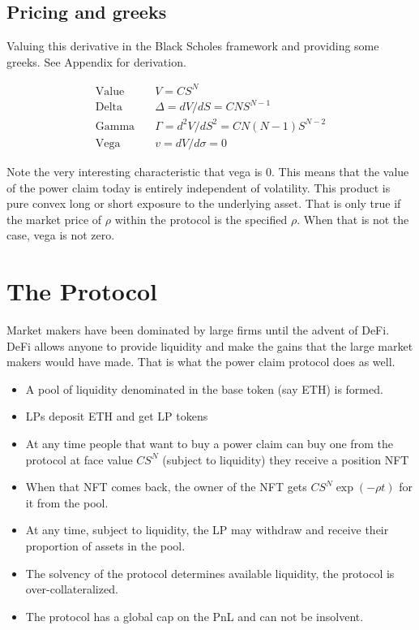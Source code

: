 \documentclass[12pt]{article}
\begin{document}
    \subsection{Pricing and greeks}

    Valuing this derivative in the Black Scholes framework and providing some greeks. See Appendix for derivation.

    \begin{align*}
        \text{Value}\quad & V = C S^N\\
        \text{Delta}\quad & \Delta = dV/dS = C N S^{N-1}\\
        \text{Gamma}\quad & \Gamma = d^2 V / d S^2 = C N(N-1) S^{N-2} \\
        \text{Vega}\quad & v = dV/d\sigma =  0
    \end{align*}

    Note the very interesting characteristic that vega is 0. This means that the value of the power claim today is entirely independent of volatility. This product is pure convex long or short exposure to the underlying asset. That is only true if the market price of $\rho$ within the protocol is the specified $\rho$. When that is not the case, vega is not zero.

    \section{The Protocol}

    Market makers have been dominated by large firms until the advent of DeFi. DeFi allows anyone to provide liquidity and make the gains that the large market makers would have made. That is what the power claim protocol does as well.

    \begin{itemize}
        \item A pool of liquidity denominated in the base token (say ETH) is formed.
        \item LPs deposit ETH and get LP tokens
        \item At any time people that want to buy a power claim can buy one from the protocol at face value $CS^N$ (subject to liquidity) they receive a position NFT
        \item When that NFT comes back, the owner of the NFT gets $CS^N \exp(-\rho t)$ for it from the pool.
        \item At any time, subject to liquidity, the LP may withdraw and receive their proportion of assets in the pool.
        \item The solvency of the protocol determines available liquidity, the protocol is over-collateralized.
        \item The protocol has a global cap on the PnL and can not be insolvent.
    \end{itemize}
\end{document}
